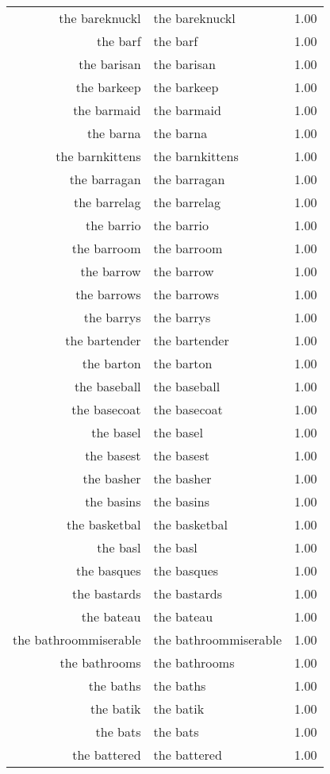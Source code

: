 \begin{table}[ht]
\begin{tabular}{rlr}
  the bareknuckl & the bareknuckl & 1.00 \\ 
  the barf & the barf & 1.00 \\ 
  the barisan & the barisan & 1.00 \\ 
  the barkeep & the barkeep & 1.00 \\ 
  the barmaid & the barmaid & 1.00 \\ 
  the barna & the barna & 1.00 \\ 
  the barnkittens & the barnkittens & 1.00 \\ 
  the barragan & the barragan & 1.00 \\ 
  the barrelag & the barrelag & 1.00 \\ 
  the barrio & the barrio & 1.00 \\ 
  the barroom & the barroom & 1.00 \\ 
  the barrow & the barrow & 1.00 \\ 
  the barrows & the barrows & 1.00 \\ 
  the barrys & the barrys & 1.00 \\ 
  the bartender & the bartender & 1.00 \\ 
  the barton & the barton & 1.00 \\ 
  the baseball & the baseball & 1.00 \\ 
  the basecoat & the basecoat & 1.00 \\ 
  the basel & the basel & 1.00 \\ 
  the basest & the basest & 1.00 \\ 
  the basher & the basher & 1.00 \\ 
  the basins & the basins & 1.00 \\ 
  the basketbal & the basketbal & 1.00 \\ 
  the basl & the basl & 1.00 \\ 
  the basques & the basques & 1.00 \\ 
  the bastards & the bastards & 1.00 \\ 
  the bateau & the bateau & 1.00 \\ 
  the bathroommiserable & the bathroommiserable & 1.00 \\ 
  the bathrooms & the bathrooms & 1.00 \\ 
  the baths & the baths & 1.00 \\ 
  the batik & the batik & 1.00 \\ 
  the bats & the bats & 1.00 \\ 
  the battered & the battered & 1.00 \\ 

\end{tabular}
\end{table}
